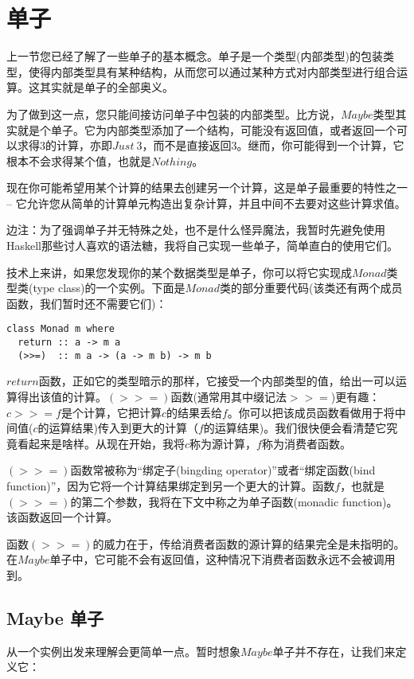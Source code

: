\section{单子}
上一节您已经了解了一些单子的基本概念。单子是一个类型(内部类型)的包装类型，使得内部类型具有某种结构，从而您可以通过某种方式对内部类型进行组合运算。这其实就是单子的全部奥义。

为了做到这一点，您只能间接访问单子中包装的内部类型。比方说，$Maybe$类型其实就是个单子。它为内部类型添加了一个结构，可能没有返回值，或者返回一个可以求得$3$的计算，亦即$Just\ 3$，而不是直接返回$3$。继而，你可能得到一个计算，它根本不会求得某个值，也就是$Nothing$。

现在你可能希望用某个计算的结果去创建另一个计算，这是单子最重要的特性之一 -- 它允许您从简单的计算单元构造出复杂计算，并且中间不去要对这些计算求值。

边注：为了强调单子并无特殊之处，也不是什么怪异魔法，我暂时先避免使用Haskell那些讨人喜欢的语法糖，我将自己实现一些单子，简单直白的使用它们。

技术上来讲，如果您发现你的某个数据类型是单子，你可以将它实现成$Monad$类型类(type class)的一个实例。下面是$Monad$类的部分重要代码(该类还有两个成员函数，我们暂时还不需要它们)：

\begin{lstlisting}
class Monad m where
  return :: a -> m a
  (>>=)  :: m a -> (a -> m b) -> m b
\end{lstlisting}


$return$函数，正如它的类型暗示的那样，它接受一个内部类型的值，给出一可以运算得出该值的计算。$(>>=)$函数(通常用其中缀记法$>>=$)更有趣： $c >>= f$是个计算，它把计算$c$的结果丢给$f$。你可以把该成员函数看做用于将中间值($c$的运算结果)传入到更大的计算（$f$的运算结果)。我们很快便会看清楚它究竟看起来是啥样。从现在开始，我将$c$称为源计算，$f$称为消费者函数。

$(>>=)$函数常被称为“绑定子(bingding operator)”或者“绑定函数(bind function)”，因为它将一个计算结果绑定到另一个更大的计算。函数$f$，也就是$(>>=)$的第二个参数，我将在下文中称之为单子函数(monadic function)。该函数返回一个计算。

函数$(>>=)$的威力在于，传给消费者函数的源计算的结果完全是未指明的。在$Maybe$单子中，它可能不会有返回值，这种情况下消费者函数永远不会被调用到。

\subsection{Maybe 单子}

从一个实例出发来理解会更简单一点。暂时想象$Maybe$单子并不存在，让我们来定义它：


